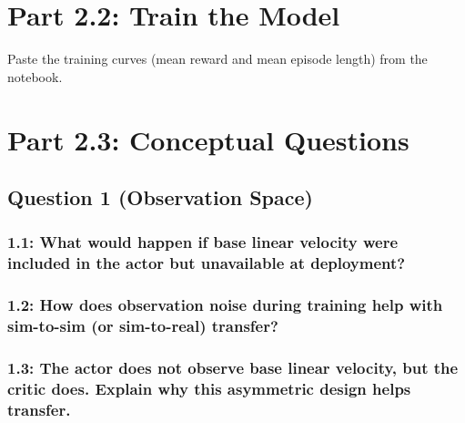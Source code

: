 \documentclass[12pt]{article}
\begin{document}
\section*{Part 2.2: Train the Model}

Paste the training curves (mean reward and mean episode length) from the notebook.
\begin{solution}[height=10cm]
\end{solution}


\newpage
\section*{Part 2.3: Conceptual Questions}

\subsection*{Question 1 (Observation Space)}

\subsubsection*{1.1: What would happen if base linear velocity were included in the actor but unavailable at deployment?}
\begin{solution}[height=7cm]
\end{solution}

\subsubsection*{1.2: How does observation noise during training help with sim-to-sim (or sim-to-real) transfer?}
\begin{solution}[height=7cm]
\end{solution}

\subsubsection*{1.3: The actor does not observe base linear velocity, but the critic does. Explain why this asymmetric design helps transfer.}
\begin{solution}[height=7cm]
\end{solution}
\end{document}
